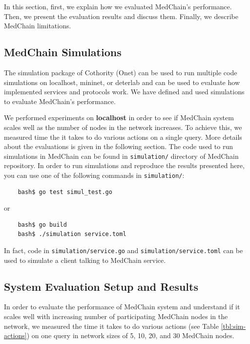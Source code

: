 In this section, first, we explain how we evaluated MedChain's performance. Then, we present the evaluation results and discuss them. Finally, we describe MedChain limitations. 

\subsection{MedChain Simulations}

The simulation package of Cothority (Onet) can be used to run multiple code simulations on localhost, mininet, or deterlab and can be used to evaluate how implemented services and protocols work. We have defined and used simulations to evaluate MedChain's performance. 

We performed experiments on \textbf{localhost} in order to see if MedChain system scales well as the number of nodes in the network increases. To achieve this, we measured time the it takes to do various actions on a single query. More details about the evaluations is given in the following section. The code used to run simulations in MedChain can be found in \texttt{simulation/} directory of MedChain repository. In order to run simulations and reproduce the results presented here, you can use one of the following commands in \texttt{simulation/}:

\begin{verbatim}
    bash$ go test simul_test.go
\end{verbatim}

or 

\begin{verbatim}
    bash$ go build
    bash$ ./simulation service.toml 
\end{verbatim}

In fact, code in \texttt{simulation/service.go} and \texttt{simulation/service.toml} can be used to simulate a client talking to MedChain service.

\subsection{System Evaluation Setup and Results}

In order to evaluate the performance of MedChain system and understand if it scales well with increasing number of participating MedChain nodes in the network, we measured the time it takes to do various actions (see Table \ref{tbl:sim-actions}) on one query in network sizes of 5, 10, 20, and 30 MedChain nodes.

